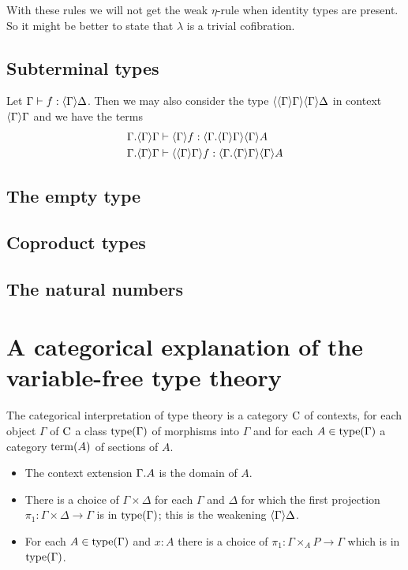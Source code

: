 With these rules we will not get the weak $\eta$-rule when identity types are present.
So it might be better to state that $\lambda$ is a trivial cofibration.

\subsection{Subterminal types}
Let $\jhom{\Gamma}{\Delta}{f}$. Then we may also consider the type $\ctxwk{{\Gamma}{\Gamma}}{{\Gamma}{\Delta}}$
in context $\ctxwk{\Gamma}{\Gamma}$ and we have the terms
\begin{align*}
& \jhom{\ctxext{\Gamma}{\ctxwk{\Gamma}{\Gamma}}}{\ctxwk{\Gamma}{A}}{\ctxwk{\Gamma}{f}}\\
& \jhom{\ctxext{\Gamma}{\ctxwk{\Gamma}{\Gamma}}}{\ctxwk{\Gamma}{A}}{\ctxwk{{\Gamma}{\Gamma}}{f}}
\end{align*}

\subsection{The empty type}

\subsection{Coproduct types}

\subsection{The natural numbers}

\section{A categorical explanation of the variable-free type theory}

The categorical interpretation of type theory is a category $\mathrm{C}$ of
contexts, for each object $\Gamma$ of $\mathrm{C}$ a class $\mathrm{type}(\Gamma)$
of morphisms into $\Gamma$ and for each $A\in\mathrm{type}(\Gamma)$ a category
$\mathrm{term}(A)$ of sections of $A$. 

\begin{itemize}
\item The context extension $\ctxext{\Gamma}{A}$ is the domain of $A$.
\item There is a choice of $\Gamma\times\Delta$ for each $\Gamma$ and $\Delta$
      for which the first projection $\pi_1:\Gamma\times\Delta\to\Gamma$ is in $\mathrm{type}(\Gamma)$;
      this is the weakening $\ctxwk{\Gamma}{\Delta}$.
\item For each $A\in\mathrm{type}(\Gamma)$ and $x:A$ there is a choice of
      $\pi_1:\Gamma\times_A P\to\Gamma$ which is in $\mathrm{type}(\Gamma)$.
\end{itemize}

